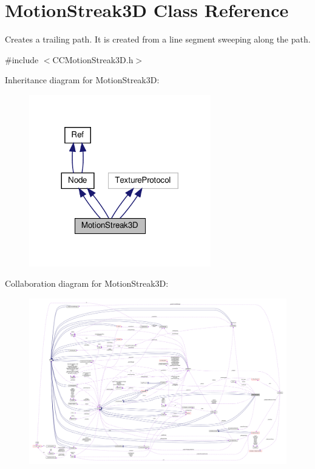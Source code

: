 \hypertarget{classMotionStreak3D}{}\section{Motion\+Streak3D Class Reference}
\label{classMotionStreak3D}


Creates a trailing path. It is created from a line segment sweeping along the path.  




{\ttfamily \#include $<$C\+C\+Motion\+Streak3\+D.\+h$>$}



Inheritance diagram for Motion\+Streak3D\+:
\nopagebreak
\begin{figure}[H]
\begin{center}
\leavevmode
\includegraphics[width=224pt]{classMotionStreak3D__inherit__graph}
\end{center}
\end{figure}


Collaboration diagram for Motion\+Streak3D\+:
\nopagebreak
\begin{figure}[H]
\begin{center}
\leavevmode
\includegraphics[width=350pt]{classMotionStreak3D__coll__graph}
\end{center}
\end{figure}
